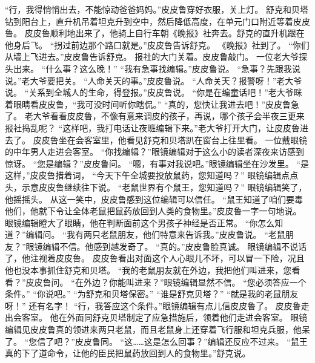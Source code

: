 \documentclass[a4paper,12pt,UTF8,twoside]{ctexbook}
\begin{document}
        “行，我得悄悄出去，不能惊动爸爸妈妈。”皮皮鲁穿好衣服，关上灯。 
        舒克和贝塔钻到阳台上，直升机吊着坦克升到空中，然后降低高度，在单元门口附近等着皮皮鲁。 
        皮皮鲁顺利地出来了，他骑上自行车朝《晚报》社奔去。舒克的直升机跟在他身后飞。 
        “拐过前边那个路口就是。”皮皮鲁告诉舒克。 
        《晚报》社到了。 
        “你们从墙上飞进去。”皮皮鲁告诉舒克。 
        报社的大门关着。皮皮鲁敲门。 
        一位老大爷探头出来。 
        “什么事？这么晚！” 
        “我有急事找编辑。”皮皮鲁说。 
        “急事？先跟我说说。”老大爷要把关。 
        “人命关天的事。”皮皮鲁说。 
        “人命关天？报警呀！”老大爷说。 
        “关系到全城人的生命，得登报。”皮皮鲁说。 
        “你是在编童话吧！”老大爷眯着眼睛看皮皮鲁，“我可没时间听你瞎侃。” 
        “真的，您快让我进去吧！”皮皮鲁急了。 
        老大爷看看皮皮鲁，不像有意来调皮的孩子，再说，哪个孩子会半夜三更来报社捣乱呢？ 
        “这样吧，我打电话让夜班编辑下来。”老大爷打开大门，让皮皮鲁进去了。 
        皮皮鲁坐在会客室里，他看见舒克和贝塔趴在窗台上往里看。 
        一位戴眼镜的中年男人走进会客室。 
        “你找编辑？”眼镜编辑对于这么小的读者深夜来访感到惊讶。 
        “您是编辑？”皮皮鲁问。 
        “嗯，有事对我说吧。”眼镜编辑坐在沙发里。 
        “是这样，”皮皮鲁措着词，  “今天下午全城要投放鼠药，您知道吗？” 
        眼镜编辑点点头，示意皮皮鲁继续往下说。 
        “老鼠世界有个鼠王，您知道吗？” 
        眼镜编辑笑了，他摇摇头。 
        从这一笑中，皮皮鲁感到这位编辑可以信任。 
        “鼠王知道了咱们要毒他们，他就下令让全体老鼠把鼠药放回到人类的食物里。”皮皮鲁一字一句地说。 
        眼镜编辑瞪大了眼睛，他在判断面前这个男孩子神经是否正常。 
        “你怎么知道？”编辑问。 
        “我有两只老鼠朋友，他们特意来告诉我。”皮皮鲁说。 
        “老鼠朋友？”眼镜编辑不信。他感到越发奇了。 
        “真的。”皮皮鲁脸真诚。 
        眼镜编辑不说话了，他注视着皮皮鲁。 
        皮皮鲁看出对面这个人心眼儿不坏，可以冒一下险，况且他也没本事抓住舒克和贝塔。 
        “我的老鼠朋友就在外边，我把他们叫进来，您看看？”皮皮鲁问。 
        “在外边？你能叫进来？”眼镜编辑显然不信。 
        “您必须答应一个条件。” 
        “你说吧。” 
        “为舒克和贝塔保密。” 
        “谁是舒克贝塔？” 
        “就是我的老鼠朋友呀！” 
        还有名字！ 
        “行，我答应这个条件。”眼镜编辑有点儿信皮皮鲁了。 
        皮皮鲁走出会客室。 
        他在外面同舒克贝塔制定了应急措施后，领着他们走进会客室。 
        眼镜编辑见皮皮鲁真的领进来两只老鼠，而且老鼠身上还穿着飞行服和坦克兵服，他呆了。 
        “您信了吧？”皮皮鲁同。 
        “这……这是怎么回事？”编辑还反应不过来。 
        “鼠王真的下了道命令，让他的臣民把鼠药放回到人的食物里。”舒克说。 
\end{document}
